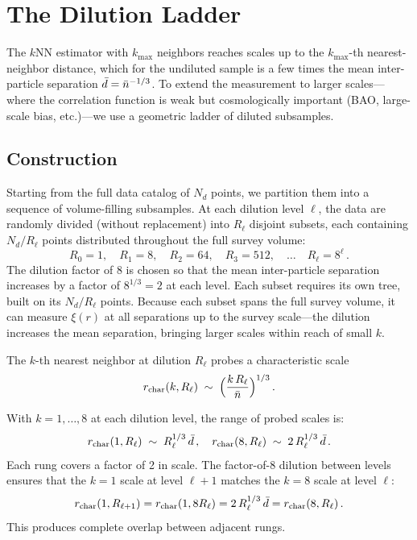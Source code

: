 \section{The Dilution Ladder}
\label{sec:ladder}

The $k$NN estimator with $k_{\max}$ neighbors reaches scales up to the $k_{\max}$-th nearest-neighbor distance, which for the undiluted sample is a few times the mean inter-particle separation $\bar{d} = \bar{n}^{-1/3}$.  To extend the measurement to larger scales---where the correlation function is weak but cosmologically important (BAO, large-scale bias, etc.)---we use a geometric ladder of diluted subsamples.

\subsection{Construction}
\label{sec:ladder_construction}

Starting from the full data catalog of $N_d$ points, we partition them into a sequence of volume-filling subsamples.  At each dilution level $\ell$, the data are randomly divided (without replacement) into $R_\ell$ disjoint subsets, each containing $N_d / R_\ell$ points distributed throughout the full survey volume:
\begin{equation}
  R_0 = 1,\quad R_1 = 8,\quad R_2 = 64,\quad R_3 = 512,\quad \ldots\quad R_\ell = 8^\ell\,.
  \label{eq:dilution_levels}
\end{equation}
The dilution factor of 8 is chosen so that the mean inter-particle separation increases by a factor of $8^{1/3} = 2$ at each level.  Each subset requires its own tree, built on its $N_d/R_\ell$ points.  Because each subset spans the full survey volume, it can measure $\xi(r)$ at all separations up to the survey scale---the dilution increases the mean separation, bringing larger scales within reach of small $k$.

The $k$-th nearest neighbor at dilution $R_\ell$ probes a characteristic scale
\begin{equation}
  r_{\rm char}(k, R_\ell) \;\sim\; \Bigl(\frac{k\,R_\ell}{\bar{n}}\Bigr)^{1/3}\,.
  \label{eq:r_char}
\end{equation}

With $k = 1, \ldots, 8$ at each dilution level, the range of probed scales is:
\begin{equation}
  r_{\rm char}(1, R_\ell) \;\sim\; R_\ell^{1/3}\,\bar{d}\,,\quad r_{\rm char}(8, R_\ell) \;\sim\; 2\,R_\ell^{1/3}\,\bar{d}\,.
  \label{eq:scale_range}
\end{equation}
Each rung covers a factor of 2 in scale.  The factor-of-8 dilution between levels ensures that the $k = 1$ scale at level $\ell + 1$ matches the $k = 8$ scale at level $\ell$:
\begin{equation}
  r_{\rm char}(1, R_{\ell+1}) = r_{\rm char}(1, 8 R_\ell) = 2\,R_\ell^{1/3}\,\bar{d} = r_{\rm char}(8, R_\ell)\,.
  \label{eq:overlap}
\end{equation}
This produces complete overlap between adjacent rungs.

